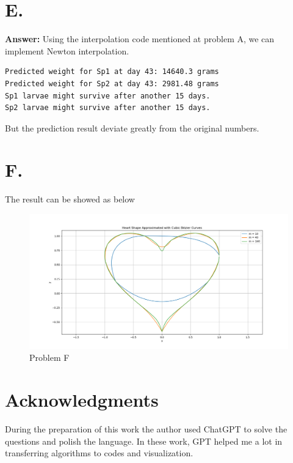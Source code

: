 \documentclass{article}
\begin{document}
\begin{CJK}{UTF8}{gbsn}
\section*{E.}

\textbf{Answer: }
Using the interpolation code mentioned at problem A, we can implement Newton interpolation.
\begin{verbatim}
Predicted weight for Sp1 at day 43: 14640.3 grams
Predicted weight for Sp2 at day 43: 2981.48 grams
Sp1 larvae might survive after another 15 days.
Sp2 larvae might survive after another 15 days.
\end{verbatim}
But the prediction result deviate greatly from the original numbers.  

\section*{F.}
The result can be showed as below
\begin{figure}[h!]
    \centering
    \includegraphics[width=1\linewidth]{F.png}
    \caption{Problem F}
\end{figure}


\section*{Acknowledgments}
During the preparation of this work the author used ChatGPT to solve the questions and polish the language.
In these work, GPT helped me a lot in transferring algorithms to codes and visualization.

%
%

\end{CJK}
\end{document}
